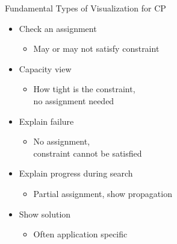 \begin{frame}{Fundamental Types of Visualization for CP}

\begin{itemize}
    \item<+-|alert@+> Check an assignment 
    \begin{itemize}
        \item May or may not satisfy constraint
    \end{itemize}
    \item<+-|alert@+> Capacity view 
    \begin{itemize}
        \item How tight is the constraint, \\no assignment needed
    \end{itemize}
    \item<+-|alert@+> Explain failure 
    \begin{itemize}
        \item No assignment, \\constraint cannot be satisfied
    \end{itemize}
    \item<+-|alert@+> Explain progress during search 
    \begin{itemize}
        \item Partial assignment, show propagation
    \end{itemize}
    \item<+-|alert@+> Show solution 
    \begin{itemize}
        \item Often application specific
    \end{itemize}
\end{itemize}    
\end{frame}

